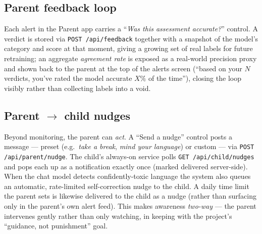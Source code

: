 \documentclass[11pt,a4paper]{article}
\begin{document}
\subsection{Parent feedback loop}
Each alert in the Parent app carries a ``\emph{Was this assessment accurate?}''
control. A verdict is stored via \texttt{POST /api/feedback} together with a snapshot
of the model's category and score at that moment, giving a growing set of real labels
for future retraining; an aggregate \emph{agreement rate} is exposed as a real-world
precision proxy and shown back to the parent at the top of the alerts screen
(``based on your $N$ verdicts, you've rated the model accurate $X\%$ of the time''),
closing the loop visibly rather than collecting labels into a void.

\subsection{Parent $\rightarrow$ child nudges}
Beyond monitoring, the parent can \emph{act}. A ``Send a nudge'' control posts a message
--- preset (e.g.\ \emph{take a break}, \emph{mind your language}) or custom --- via
\texttt{POST /api/parent/nudge}. The child's always-on service polls
\texttt{GET /api/child/nudges} and pops each up as a notification exactly once (marked
delivered server-side). When the chat model detects confidently-toxic language the
system also queues an automatic, rate-limited self-correction nudge to the child. A
daily time limit the parent sets is likewise delivered to the child as a nudge (rather
than surfacing only in the parent's own alert feed). This makes awareness \emph{two-way}
--- the parent intervenes gently rather than only watching, in keeping with the
project's ``guidance, not punishment'' goal.
\end{document}
